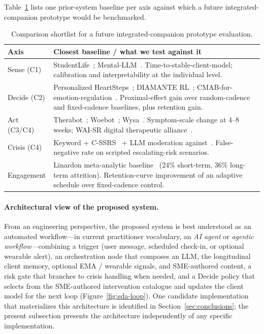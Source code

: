 \documentclass[11pt,a4paper]{article}
\newcommand{\secref}[1]{Section~\ref{#1}}
\newcommand{\tabref}[1]{Table~\ref{#1}}
\newcommand{\figref}[1]{Figure~\ref{#1}}
\begin{document}
\tabref{tab:comparison} lists one prior-system baseline per axis
against which a future integrated-companion prototype would be
benchmarked.

\begin{table}[t]
\small
\begin{tabularx}{\textwidth}{l X}
\toprule
\textbf{Axis} & \textbf{Closest baseline / what we test against it} \\
\midrule
Sense (C1) & StudentLife~\cite{Wang2014StudentLife,Wang2020COVIDStudentLife}; Mental-LLM~\cite{Xu2024MentalLLM}. Time-to-stable-client-model; calibration and interpretability at the individual level. \\
Decide (C2) & Personalized HeartSteps~\cite{Liao2020PersonalizedHeartSteps}; DIAMANTE RL~\cite{Aguilera2024DIAMANTERL}; CMAB-for-emotion-regulation~\cite{Ameko2020CMABEmotion}. Proximal-effect gain over random-cadence and fixed-cadence baselines, plus retention gain. \\
Act (C3/C4) & Therabot~\cite{Heinz2025TherabotRCT}; Woebot~\cite{Fitzpatrick2017Woebot}; Wysa~\cite{Inkster2018Wysa}. Symptom-scale change at 4--8 weeks; WAI-SR digital therapeutic alliance~\cite{Hatcher2006WAISR}. \\
Crisis (C4) & Keyword + C-SSRS~\cite{Posner2011CSSRS} + LLM moderation against~\cite{DeFreitas2024ChatbotSafety,Scholich2025TherapistVsChatbot}. False-negative rate on scripted escalating-risk scenarios. \\
Engagement & Linardon meta-analytic baseline~\cite{Linardon2020Attrition} (24\% short-term, 36\% long-term attrition). Retention-curve improvement of an adaptive schedule over fixed-cadence control. \\
\bottomrule
\end{tabularx}
\caption{Comparison shortlist for a future integrated-companion
prototype evaluation.}
\label{tab:comparison}
\end{table}

\paragraph{Architectural view of the proposed system.}
From an engineering perspective, the proposed system is best
understood as an automated workflow---in current practitioner
vocabulary, an \emph{AI agent} or \emph{agentic
workflow}---combining a trigger (user message, scheduled
check-in, or optional wearable alert), an orchestration node that
composes an LLM, the longitudinal client memory, optional EMA /
wearable signals, and SME-authored content, a risk gate that
branches to crisis handling when needed, and a Decide policy that
selects from the SME-authored intervention catalogue and updates
the client model for the next loop (\figref{fig:sda-loop}). One
candidate implementation that materializes this
architecture is identified in \secref{sec:conclusions}; the
present subsection presents the architecture independently of any
specific implementation.
\end{document}
